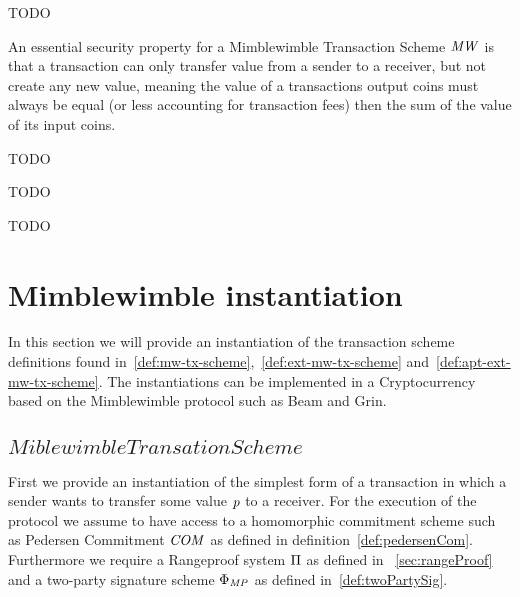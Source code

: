 \begin{definition}
    \label{def:apt-ext-mw-tx-scheme}
    TODO
\end{definition}

An essential security property for a Mimblewimble Transaction Scheme $\mathit{MW}$ is that a transaction can only transfer value from a sender to a receiver, but not create any new value, meaning the value
of a transactions output coins must always be equal (or less accounting for transaction fees) then the sum of the value of its input coins.

\begin{definition}
    TODO
\end{definition}

\begin{definition}
    TODO
\end{definition}

\begin{definition}
    TODO
\end{definition}


\section{Mimblewimble instantiation}\label{sec:atomic-inst}

In this section we will provide an instantiation of the transaction scheme definitions found in~\ref{def:mw-tx-scheme},~\ref{def:ext-mw-tx-scheme} and~\ref{def:apt-ext-mw-tx-scheme}. The instantiations can be
implemented in a Cryptocurrency based on the Mimblewimble protocol such as Beam and Grin.

\subsection{$Miblewimble Transation Scheme$}

First we provide an instantiation of the simplest form of a transaction in which a sender wants to transfer some value $\mathit{p}$ to a receiver. For the execution of the protocol we assume to have access to a homomorphic
commitment scheme such as Pedersen Commitment $\mathit{COM}$ as defined in definition~\ref{def:pedersenCom}. Furthermore we require a Rangeproof system $\Pi$ as defined in
~\ref{sec:rangeProof} and a two-party signature scheme $\Phi_{\mathit{MP}}$ as defined in~\ref{def:twoPartySig}.

